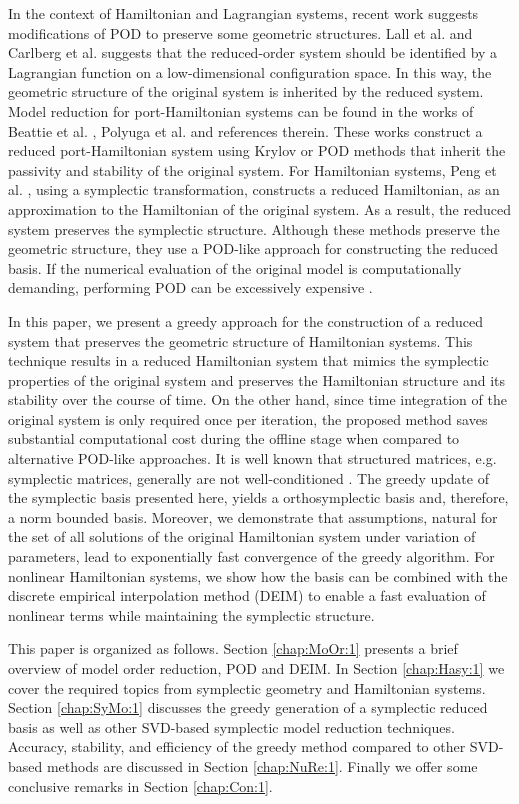 In the context of Hamiltonian and Lagrangian systems, recent work suggests modifications of POD to preserve {\edit some} geometric structures. Lall et al. \cite{Lall:2003iy} and Carlberg et al. \cite{Carlberg:2014ky} suggests that the reduced-order system should be identified by a Lagrangian function on a low-dimensional configuration space. In this way, the geometric structure of the original system is inherited by the reduced system. {\edit Model reduction for port-Hamiltonian systems can be found in the works of Beattie et al. \cite{Chaturantabut:2016he}, Polyuga et al. \cite{Polyuga:2010gj} and references therein. These works construct a reduced port-Hamiltonian system using Krylov or POD methods that inherit the passivity and stability of the original system.} For Hamiltonian systems, Peng et al. \cite{Peng:2014di}, using a symplectic transformation, constructs a reduced Hamiltonian, as an approximation to the Hamiltonian of the original system. As a result, the reduced system preserves the symplectic structure. Although these methods preserve {\edit the} geometric structure, they use a POD-like approach for constructing the reduced basis. {\blue If the numerical evaluation of the original model is computationally demanding, performing POD can be excessively expensive \cite{Quarteroni:2016wi}.}

In this paper, we present a greedy approach for the construction of a reduced system that preserves the geometric structure of Hamiltonian systems. This technique results in a reduced Hamiltonian system that mimics the symplectic properties of the original system and preserves the Hamiltonian structure and its stability over the course of time. On the other hand, since time integration of the original system is only required once per iteration, the proposed method saves substantial computational cost during the offline stage when compared to alternative POD-like approaches. {\edit It is well known that structured matrices, e.g. symplectic matrices, generally are not well-conditioned \cite{Karow:2006cf}. The greedy update of the symplectic basis presented here, yields a orthosymplectic basis and, therefore, a norm bounded basis.} Moreover, we demonstrate that assumptions, natural for the set of all solutions of the original Hamiltonian system under variation of parameters, lead to exponentially fast convergence of the greedy algorithm. For nonlinear Hamiltonian systems, we show how the basis can be combined with the discrete empirical interpolation method (DEIM) {\edit \cite{Chaturantabut:2010cz,Barrault:2004kz}} to enable a fast evaluation of nonlinear terms while maintaining the symplectic structure.

This paper is organized as follows. Section \ref{chap:MoOr:1} presents a brief overview of model order reduction, POD and DEIM. In Section \ref{chap:Hasy:1} we cover the required topics from symplectic geometry and Hamiltonian systems. Section \ref{chap:SyMo:1} discusses the greedy generation of a symplectic reduced basis as well as other SVD-based symplectic model reduction techniques. Accuracy, stability, and efficiency of the greedy method compared to other SVD-based methods are discussed in Section \ref{chap:NuRe:1}. {\edit Finally we offer some conclusive remarks in Section \ref{chap:Con:1}}.
